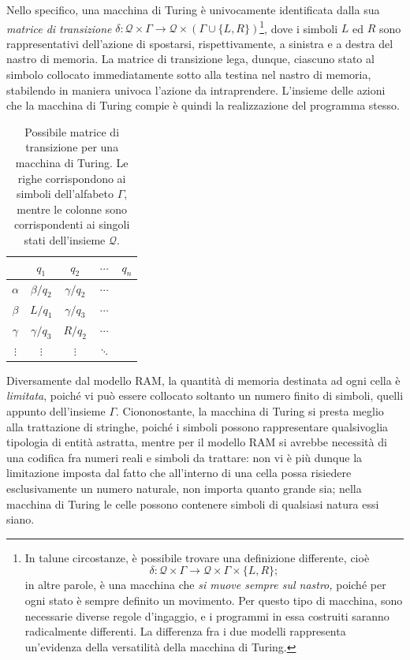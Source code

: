 \documentclass[10pt]{book}
\begin{document}
Nello specifico, una macchina di Turing è univocamente identificata dalla sua
\emph{matrice di transizione} $\delta  : \mathcal Q \times \Gamma \rightarrow
\mathcal Q \times (\Gamma \cup \{L,R\})$\footnote{In talune circostanze, è
possibile trovare una definizione differente, cioè $$\delta  : \mathcal Q \times
\Gamma \rightarrow \mathcal Q \times \Gamma \times \{L,R\};$$ in altre parole, è
una macchina che \emph{si muove sempre sul nastro,} poiché per ogni stato è
sempre definito un movimento. Per questo tipo di macchina, sono necessarie
diverse regole d'ingaggio, e i programmi in essa costruiti saranno radicalmente
differenti. La differenza fra i due modelli rappresenta un'evidenza della
versatilità della macchina di Turing.}, dove i simboli $L$ ed $R$ sono
rappresentativi dell'azione di spostarsi, rispettivamente, a sinistra e a
destra del nastro di memoria. La matrice di transizione lega, dunque, ciascuno
stato al simbolo collocato immediatamente sotto alla testina nel nastro di
memoria, stabilendo in maniera univoca l'azione da intraprendere. L'insieme
delle azioni che la macchina di Turing compie è quindi la realizzazione del
programma stesso.



\begin{table}[ht]
\centering
\begin{tabular}{c|cccc}
    & $q_1$ & $q_2$ & $\cdots$ & $q_n$ \\
    \hline
$\alpha$ & $\beta/q_2$ & $\gamma/q_2$ & $\cdots$ & \\
$\beta$ & $L/q_1$ & $\gamma/q_3$ & $\cdots$ & \\
$\gamma$ & $\gamma/q_3$ & $R/q_2$ & $\cdots$ & \\
$\vdots$ & $\vdots$ & $\vdots$ & $\ddots$ &    
\end{tabular}
\caption{Possibile matrice di transizione per una macchina di Turing. Le righe
corrispondono ai simboli dell'alfabeto $\Gamma$, mentre le colonne sono
corrispondenti ai singoli stati dell'insieme $\mathcal
Q$.}\label{tab:matriceTransizione}
\end{table}
\bigskip


Diversamente dal modello RAM, la quantità di memoria destinata ad ogni cella è
\emph{limitata}, poiché vi può essere collocato soltanto un numero finito di
simboli, quelli appunto dell'insieme $\Gamma$. Ciononostante, la macchina di
Turing si presta meglio alla trattazione di stringhe, poiché i simboli possono
rappresentare qualsivoglia tipologia di entità astratta, mentre per il modello
RAM si avrebbe necessità di una codifica fra numeri reali e simboli da
trattare: non vi è più dunque la limitazione imposta dal fatto che all'interno
di una cella possa risiedere esclusivamente un numero naturale, non importa
quanto grande sia; nella macchina di Turing le celle possono contenere simboli
di qualsiasi natura essi siano.
\end{document}
